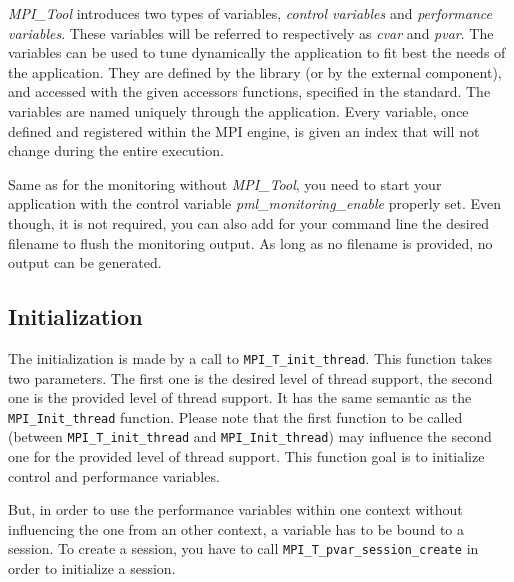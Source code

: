 \documentclass[notitlepage]{article}
\newcommand{\mpit}[1]{\textit{MPI\_Tool#1}}
\newcommand{\brkunds}[0]{\allowbreak\_}
\begin{document}
\mpit{} introduces two types of variables, \textit{control variables}
and \textit{performance variables}. These variables will be referred
to respectively as \textit{cvar} and \textit{pvar}. The variables can
be used to tune dynamically the application to fit best the needs of
the application. They are defined by the library (or by the external
component), and accessed with the given accessors functions, specified
in the standard. The variables are named uniquely through the
application. Every variable, once defined and registered within the
MPI engine, is given an index that will not change during the entire
execution.

Same as for the monitoring without \mpit{}, you need to start your
application with the control variable
\textit{pml\brkunds{}monitoring\brkunds{}enable} properly set. Even
though, it is not required, you can also add for your command line the
desired filename to flush the monitoring output. As long as no
filename is provided, no output can be generated.

\subsection{Initialization}

The initialization is made by a call to
\texttt{MPI\brkunds{}T\brkunds{}init\brkunds{}thread}.  This function
takes two parameters. The first one is the desired level of thread
support, the second one is the provided level of thread support. It
has the same semantic as the
\texttt{MPI\brkunds{}Init\brkunds{}thread} function. Please note that
the first function to be called (between
\texttt{MPI\brkunds{}T\brkunds{}init\brkunds{}thread} and
\texttt{MPI\brkunds{}Init\brkunds{}thread}) may influence the second
one for the provided level of thread support. This function goal is to
initialize control and performance variables.

But, in order to use the performance variables within one context
without influencing the one from an other context, a variable has to
be bound to a session. To create a session, you have to call
\texttt{MPI\brkunds{}T\brkunds{}pvar\brkunds{}session\brkunds{}create}
in order to initialize a session.
\end{document}
